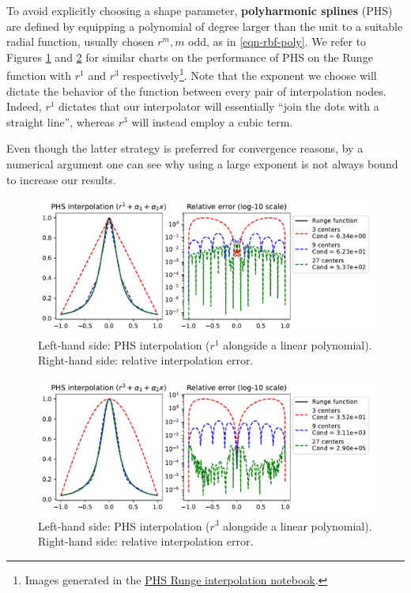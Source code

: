 \documentclass[12pt]{report} %
\begin{document}
To avoid explicitly choosing a shape parameter, \textbf{polyharmonic splines} (PHS) are defined by equipping a polynomial of degree larger than the unit to a suitable radial function, usually chosen $r^m,m$ odd, as in \eqref{eqn-rbf-poly}. We refer to Figures \ref{fig:phs-runge-phenomenon-deg-1-discussion} and \ref{fig:phs-runge-phenomenon-deg-3-discussion} for similar charts on the performance of PHS on the Runge function with $r^1$ and $r^3$ respectively\footnote{Images generated in the \href{https://github.com/heqro/tfm-experiments/blob/main/introductory_notebooks/rbf_interpolation/runge_phs.ipynb}{PHS Runge interpolation notebook}.}. Note that the exponent we choose will dictate the behavior of the function between every pair of interpolation nodes. Indeed, $r^1$ dictates that our interpolator will essentially ``join the dots with a straight line'', whereas $r^3$ will instead employ a cubic term.

Even though the latter strategy is preferred for convergence reasons, by a numerical argument one can see why using a large exponent is not always bound to increase our results.

\begin{figure}[ht]
  \centering
  \includegraphics[width=\textwidth]{imagenes/phs_interpolation/runge_phs_r1_deg1.pdf}
  \caption{Left-hand side: PHS interpolation ($r^1$ alongside a linear polynomial). Right-hand side: relative interpolation error.}
  \label{fig:phs-runge-phenomenon-deg-1-discussion}
\end{figure}

\begin{figure}[ht]
  \centering
  \includegraphics[width=\textwidth]{imagenes/phs_interpolation/runge_phs_r3_deg1.pdf}
  \caption{Left-hand side: PHS interpolation ($r^3$ alongside a linear polynomial). Right-hand side: relative interpolation error.}
  \label{fig:phs-runge-phenomenon-deg-3-discussion}
\end{figure}
\end{document}
